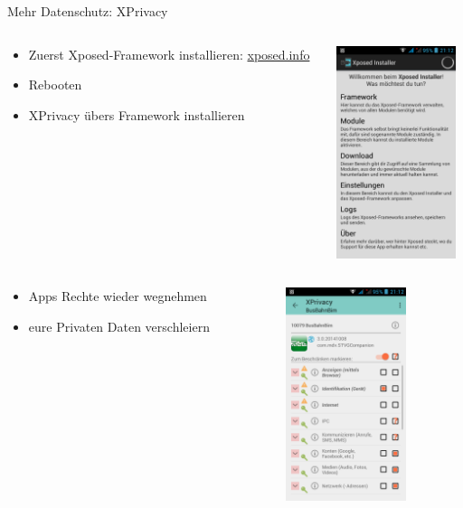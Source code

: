 \documentclass{beamer}
\begin{document}
\begin{frame}{Mehr Datenschutz: XPrivacy}

\begin{columns}[c]
  \begin{column}[T]{.7\textwidth}
    \begin{itemize}
      \item Zuerst Xposed-Framework installieren: \href{http://xposed.info}{xposed.info}
      \item Rebooten
      \item XPrivacy übers Framework installieren
    \end{itemize}
  \end{column}
  \begin{column}[T]{.3\textwidth}
    \includegraphics[width=3.5cm]{xposed.png} 
   \end{column}
\end{columns}

        \pause

\begin{columns}[c]
  \begin{column}[T]{.7\textwidth}

    \vspace{-2cm}
      \begin{itemize}
        \item Apps Rechte wieder wegnehmen
        \item eure Privaten Daten verschleiern
      \end{itemize}
   \end{column}
  \begin{column}[T]{.3\textwidth}
    \vspace{-6.1cm}
    \includegraphics[width=3.5cm]{xprivacy.png} 
   \end{column}
\end{columns}


\end{frame}
\end{document}
